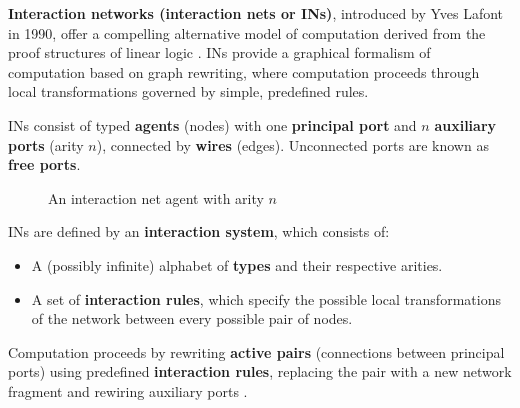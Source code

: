 \textbf{Interaction networks (interaction nets or INs)}, introduced by Yves Lafont in 1990, offer a compelling alternative model of computation derived from the proof structures of linear logic \cite{lafont1990interactionnets}. INs provide a graphical formalism of computation based on graph rewriting, where computation proceeds through local transformations governed by simple, predefined rules. 

\newpage

INs consist of typed \textbf{agents} (nodes) with one \textbf{principal port} and \(n\) \textbf{auxiliary ports} (arity \(n\)), connected by \textbf{wires} (edges). Unconnected ports are known as \textbf{free ports}.

\begin{figure}[h]
    \centering
    \caption{An interaction net agent with arity $n$}
    \label{fig:intro_agent}
\end{figure}

INs are defined by an \textbf{interaction system}, which consists of:

\begin{itemize}
    \item A (possibly infinite) alphabet of \textbf{types} and their respective arities.
    \item A set of \textbf{interaction rules}, which specify the possible local transformations of the network between every possible pair of nodes.
\end{itemize}

Computation proceeds by rewriting \textbf{active pairs} (connections between principal ports) using predefined \textbf{interaction rules}, replacing the pair with a new network fragment and rewiring auxiliary ports \cite{lafont1990interactionnets}.

